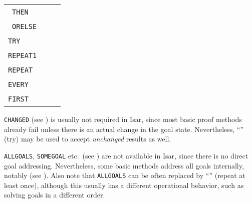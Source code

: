 \begin{isabellebody}
\begin{isamarkuptext}
  \medskip
  \begin{tabular}{lll}
    \isa{{\isachardoublequote}tac\isactrlsub {\isadigit{1}}{\isachardoublequote}}~\verb|THEN|~\isa{{\isachardoublequote}tac\isactrlsub {\isadigit{2}}{\isachardoublequote}} & & \isa{{\isachardoublequote}meth\isactrlsub {\isadigit{1}}{\isacharcomma}\ meth\isactrlsub {\isadigit{2}}{\isachardoublequote}} \\
    \isa{{\isachardoublequote}tac\isactrlsub {\isadigit{1}}{\isachardoublequote}}~\verb|ORELSE|~\isa{{\isachardoublequote}tac\isactrlsub {\isadigit{2}}{\isachardoublequote}} & & \isa{{\isachardoublequote}meth\isactrlsub {\isadigit{1}}\ {\isacharbar}\ meth\isactrlsub {\isadigit{2}}{\isachardoublequote}} \\
    \verb|TRY|~\isa{tac} & & \isa{{\isachardoublequote}meth{\isacharquery}{\isachardoublequote}} \\
    \verb|REPEAT1|~\isa{tac} & & \isa{{\isachardoublequote}meth{\isacharplus}{\isachardoublequote}} \\
    \verb|REPEAT|~\isa{tac} & & \isa{{\isachardoublequote}{\isacharparenleft}meth{\isacharplus}{\isacharparenright}{\isacharquery}{\isachardoublequote}} \\
    \verb|EVERY|~\isa{{\isachardoublequote}{\isacharbrackleft}tac\isactrlsub {\isadigit{1}}{\isacharcomma}\ {\isasymdots}{\isacharbrackright}{\isachardoublequote}} & & \isa{{\isachardoublequote}meth\isactrlsub {\isadigit{1}}{\isacharcomma}\ {\isasymdots}{\isachardoublequote}} \\
    \verb|FIRST|~\isa{{\isachardoublequote}{\isacharbrackleft}tac\isactrlsub {\isadigit{1}}{\isacharcomma}\ {\isasymdots}{\isacharbrackright}{\isachardoublequote}} & & \isa{{\isachardoublequote}meth\isactrlsub {\isadigit{1}}\ {\isacharbar}\ {\isasymdots}{\isachardoublequote}} \\
  \end{tabular}
  \medskip

  \medskip \verb|CHANGED| (see \cite{isabelle-ref}) is usually not
  required in Isar, since most basic proof methods already fail unless
  there is an actual change in the goal state.  Nevertheless, ``\isa{{\isachardoublequote}{\isacharquery}{\isachardoublequote}}''  (try) may be used to accept \emph{unchanged} results as
  well.

  \medskip \verb|ALLGOALS|, \verb|SOMEGOAL| etc.\ (see
  \cite{isabelle-ref}) are not available in Isar, since there is no
  direct goal addressing.  Nevertheless, some basic methods address
  all goals internally, notably \mbox{} (see
  ).  Also note that \verb|ALLGOALS| can be
  often replaced by ``\isa{{\isachardoublequote}{\isacharplus}{\isachardoublequote}}'' (repeat at least once), although
  this usually has a different operational behavior, such as solving
  goals in a different order.


\end{isamarkuptext}
\end{isabellebody}
